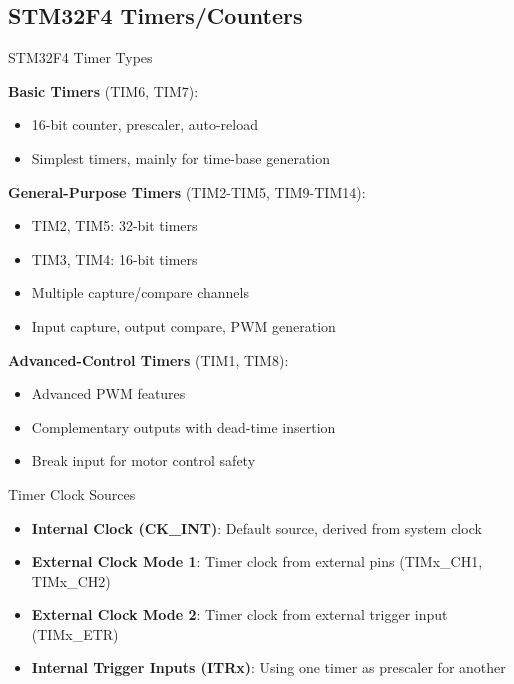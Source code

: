 \raggedcolumns
\columnbreak






\subsection{STM32F4 Timers/Counters}


\begin{concept}{STM32F4 Timer Types}

\textbf{Basic Timers} (TIM6, TIM7):
    \begin{itemize}
        \item 16-bit counter, prescaler, auto-reload
        \item Simplest timers, mainly for time-base generation
    \end{itemize}
    \textbf{General-Purpose Timers} \small{(TIM2-TIM5, TIM9-TIM14):}
    \normalsize
    \begin{itemize}
        \item TIM2, TIM5: 32-bit timers
        \item TIM3, TIM4: 16-bit timers
        \item Multiple capture/compare channels
        \item Input capture, output compare, PWM generation
    \end{itemize}
    \textbf{Advanced-Control Timers} (TIM1, TIM8):
    \begin{itemize}
        \item Advanced PWM features
        \item Complementary outputs with dead-time insertion
        \item Break input for motor control safety
    \end{itemize}
\end{concept}

\begin{theorem}{Timer Clock Sources}
\begin{itemize}
    \item \textbf{Internal Clock (CK\_INT)}: Default source, derived from system clock
    \item \textbf{External Clock Mode 1}: Timer clock from external pins (TIMx\_CH1, TIMx\_CH2)
    \item \textbf{External Clock Mode 2}: Timer clock from external trigger input (TIMx\_ETR)
    \item \textbf{Internal Trigger Inputs (ITRx)}: Using one timer as prescaler for another
\end{itemize}
\end{theorem}

